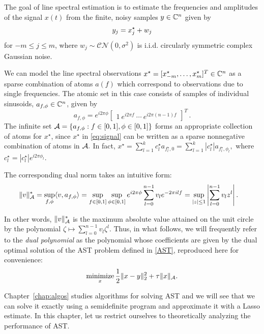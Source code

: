 The goal of line spectral estimation is to estimate the frequencies and 
amplitudes of the signal $x(t)$ from the finite, noisy samples $y \in \mathbb{C}^n$ 
given by
\[
  y_j  =  x_j^\star + w_j\\
\]
for $-m \leq j \leq m$, where $w_j \sim \mathcal{C}\mathcal{N}(0,\sigma^2)$ is 
i.i.d. circularly symmetric complex Gaussian noise. 

We can model the line spectral observations $x^\star = [x_{-m}^\star,
\ldots,x_{m}^\star]^T \in \mathbb{C}^n$ as a sparse combination of atoms $a(f)$ 
which correspond to observations due to single frequencies. The atomic set in
this case consists of samples of individual sinusoids, $a_{f,\phi} \in \mathbb{C}^n$,
given by
\begin{equation}
\label{eq:trig-atoms} a_{f,\phi} = e^{i2\pi \phi}\begin{bmatrix}1 ~ e^{i2\pi f} ~
\cdots ~ e^{i2\pi(n-1)f} \end{bmatrix}^T\,.
\end{equation}
The  infinite set $\mathcal{A} = \{ a_{f,\phi}: f \in
[0,1], \phi \in [0,1] \}$ forms an appropriate collection of atoms for
$x^\star$, since $x^\star$ in \eqref{eq:signal} can be written as a sparse
nonnegative combination of atoms in $\mathcal{A}.$ In fact, $x^\star = \sum_{l = 1}^k
c_l^\star a_{f_l^\star,0} = \sum_{l = 1}^k |c_l^\star| a_{f_l^\star,\phi_l},$
where $c_l^\star = |c_l^\star|e^{i2\pi\phi_l}.$

The corresponding dual norm takes an intuitive form:
\begin{align}
	\|v\|_{\mathcal{A}}^* &= \sup_{{f,\phi}} \langle v, a_{f,\phi} \rangle=\sup_{f\in [0,1]}  \sup_{\phi \in [0,1]}  e^{i 2\pi \phi} \sum_{l=0}^{n-1} v_l e^{-2\pi i l f} =\sup_{ |z|\leq 1 }  \left| \sum_{l=0}^{n-1} v_l z^l\right|.\label{eq:dual-norm-poly}
\end{align}

In other words, $\|v\|_{\mathcal{A}}^*$ is the maximum absolute value attained on the
unit circle by the polynomial $\zeta \mapsto \sum_{l=0}^{n-1} v_l \zeta^l$.
Thus, in what follows, we will frequently refer to the \emph{dual polynomial} as
the polynomial whose coefficients are given by the dual optimal solution of the
AST problem defined in \eqref{AST}, reproduced here for convenience:
\begin{equation}
\label{eq:linespect:ast}
\mathop{\textrm{minimize}}_x \frac{1}{2} \lVert x - y\rVert_2^2 + \tau \lVert x\rVert_{\mathcal{A}}.
\end{equation}

Chapter~\ref{chap:algos} studies algorithms for solving AST and we will see that
we can solve it exactly using a semidefinite program and approximate it with a
Lasso estimate. In this chapter, let us restrict ourselves to theoretically
analyzing the performance of AST.

